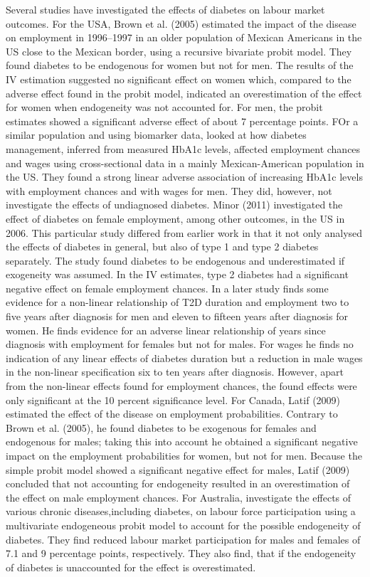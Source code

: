 Several studies have investigated the effects of diabetes on labour market outcomes. For the USA, Brown et al. (2005) estimated the impact of the disease on employment in 1996--1997 in an older population of Mexican Americans in the \ac{US} close to the Mexican border, using a recursive bivariate probit model. They found diabetes to be endogenous for women but not for men. The results of the \ac{IV} estimation suggested no significant effect on women which, compared to the adverse effect found in the probit model, indicated an overestimation of the effect for women when endogeneity was not accounted for. For men, the probit estimates showed a significant adverse effect of about 7 percentage points. FOr a similar population and using biomarker data,\citet{BrownIII2011} looked
at how diabetes management, inferred from measured \ac{HbA1c} levels,
affected employment chances and wages using cross-sectional data in
a mainly Mexican-American population in the US. They found a strong
linear adverse association of increasing \ac{HbA1c} levels with
employment chances and with wages for men. They did, however, not investigate the effects of undiagnosed diabetes. Minor (2011) investigated the effect of diabetes on female employment, among other outcomes, in the \ac{US} in 2006. This particular study differed from earlier work in that it not only analysed the effects of diabetes in general, but also of type 1 and type 2 diabetes separately. The study found diabetes to be endogenous and underestimated if exogeneity was assumed. In the \ac{IV} estimates, type 2 diabetes had a significant negative effect on female employment chances. In a later study \citet{Minor2013}
finds some evidence for a non-linear relationship of \ac{T2D} duration
and employment two to five years after diagnosis for men and eleven
to fifteen years after diagnosis for women. He finds evidence for
an adverse linear relationship of years since diagnosis with employment
for females but not for males. For wages he finds no indication of
any linear effects of diabetes duration but a reduction in male wages
in the non-linear specification six to ten years after diagnosis.
However, apart from the non-linear effects found for employment chances,
the found effects were only significant at the 10 percent significance
level. For Canada, Latif (2009) estimated the effect of the disease on employment probabilities. Contrary to Brown et al. (2005), he found diabetes to be exogenous for females and endogenous for males; taking this into account he obtained a significant negative impact on the employment probabilities for women, but not for men. Because the simple probit model showed a significant negative effect for males, Latif (2009) concluded that not accounting for 
endogeneity resulted in an overestimation of the effect on male employment chances. For Australia, \cite{Zhang_2009} investigate the effects of various chronic diseases,including diabetes, on labour force participation using a multivariate endogeneous probit model to account for the possible endogeneity of diabetes. They find reduced labour market participation for males and females of 7.1 and 9 percentage points, respectively. They also find, that if the endogeneity of diabetes is unaccounted for the effect is overestimated. 

